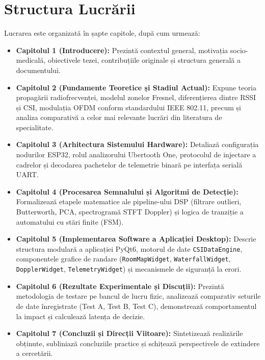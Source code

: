 \section{Structura Lucrării}
Lucrarea este organizată în șapte capitole, după cum urmează:
\begin{itemize}
    \item \textbf{Capitolul 1 (Introducere):} Prezintă contextul general, motivația socio-medicală, obiectivele tezei, contribuțiile originale și structura generală a documentului.
    \item \textbf{Capitolul 2 (Fundamente Teoretice și Stadiul Actual):} Expune teoria propagării radiofrecvenței, modelul zonelor Fresnel, diferențierea dintre RSSI și CSI, modulația OFDM conform standardului IEEE 802.11, precum și analiza comparativă a celor mai relevante lucrări din literatura de specialitate.
    \item \textbf{Capitolul 3 (Arhitectura Sistemului Hardware):} Detaliază configurația nodurilor ESP32, rolul analizorului Ubertooth One, protocolul de injectare a cadrelor și decodarea pachetelor de telemetrie binară pe interfața serială UART.
    \item \textbf{Capitolul 4 (Procesarea Semnalului și Algoritmi de Detecție):} Formalizează etapele matematice ale pipeline-ului DSP (filtrare outlieri, Butterworth, PCA, spectrogramă STFT Doppler) și logica de tranziție a automatului cu stări finite (FSM).
    \item \textbf{Capitolul 5 (Implementarea Software a Aplicației Desktop):} Descrie structura modulară a aplicației PyQt6, motorul de date \texttt{CSIDataEngine}, componentele grafice de randare (\texttt{RoomMapWidget}, \texttt{WaterfallWidget}, \texttt{DopplerWidget}, \texttt{TelemetryWidget}) și mecanismele de siguranță la erori.
    \item \textbf{Capitolul 6 (Rezultate Experimentale și Discuții):} Prezintă metodologia de testare pe bancul de lucru fizic, analizează comparativ seturile de date înregistrate (Test A, Test B, Test C), demonstrează comportamentul la impact și calculează latența de decizie.
    \item \textbf{Capitolul 7 (Concluzii și Direcții Viitoare):} Sintetizează realizările obținute, subliniază concluziile practice și schițează perspectivele de extindere a cercetării.
\end{itemize}
